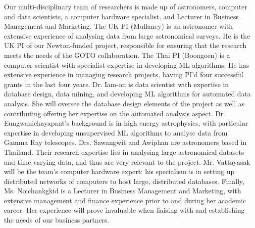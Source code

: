 \documentclass[11pt]{article}
\begin{document}
  \noindent
  Our multi-disciplinary team of researchers is made up of astronomers, computer and data scientists, a computer hardware specialist, and Lecturer in Business Management and Marketing. The UK PI (Mullaney) is an astronomer with extensive experience of analysing data from large astronomical surveys. He is the UK PI of our Newton-funded project, responsible for ensuring that the research meets the needs of the GOTO collaboration. The Thai PI (Boongoen) is a computer scientist with specialist expertise in developing ML algorithms. He has extensive experience in managing research projects, having PI'd four successful grants in the last four years. Dr. Iam-on is data scientist with expertise in database design, data mining, and developing ML algorithms for automated data analysis. She will oversee the database design elements of the project as well as contributing offering her expertise on the automated analysis aspect. Dr. Eungwanichayapant's background is in high energy astrophysics, with particular expertise in developing unsupervised ML algorithms to analyse data from Gamma Ray telescopes. Drs. Sawangwit and Awiphan are astronomers based in Thailand. Their research expertise lies in analysing large astronomical datasets and time varying data, and thus are very relevant to the project. Mr. Vattayasak will be the team's computer hardware expert: his specialism is in setting up distributed networks of computers to host large, distributed databases. Finally, Ms. Noichankgkid is a Lecturer in Business Management and Marketing, with extensive management and finance experience prior to and during her academic career. Her experience will prove invaluable when liaising with and establishing the needs of our business partners. 
  
  
  
  
\end{document}
